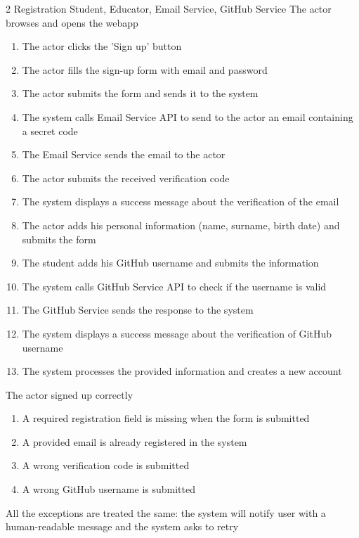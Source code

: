 \usecase
{2}
{Registration} %
{Student, Educator, Email Service, GitHub Service} %
{The actor browses and opens the webapp} %
{ %
    \begin{enumerate}
        \item The actor clicks the 'Sign up' button 
        \item The actor fills the sign-up form with email and password
        \item The actor submits the form and sends it to the system
        \item The system calls Email Service API to send to the actor an email containing a secret code
        \item The Email Service sends the email to the actor
        \item The actor submits the received verification code
        \item The system displays a success message about the verification of the email
        \item The actor adds his personal information (name, surname, birth date) and submits the form
        \item The student adds his GitHub username and submits the information
        \item The system calls GitHub Service API to check if the username is valid
        \item The GitHub Service sends the response to the system
        \item The system displays a success message about the verification of GitHub username
        \item The system processes the provided information and creates a new account
    \end{enumerate}
}
{The actor signed up correctly} %
{ %
    \begin{enumerate}
        \item A required registration field is missing when the form is submitted
        \item A provided email is already registered in the system
        \item A wrong verification code is submitted
        \item A wrong GitHub username is submitted
    \end{enumerate}
}
{ %
    All the exceptions are treated the same: the system will notify user with a human-readable message and the system asks to retry
}

